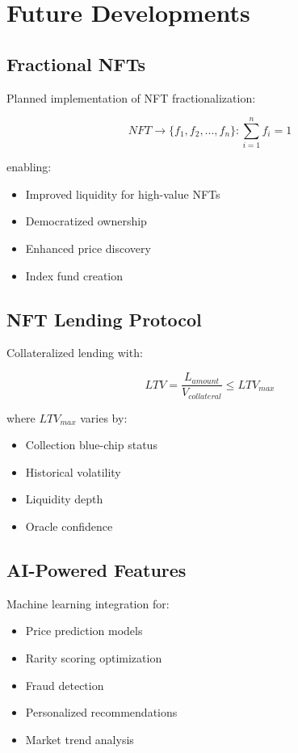 \documentclass[11pt,a4paper]{article}
\begin{document}
\section{Future Developments}

\subsection{Fractional NFTs}

Planned implementation of NFT fractionalization:

\begin{equation}
NFT \rightarrow \{f_1, f_2, ..., f_n\} : \sum_{i=1}^{n} f_i = 1
\end{equation}

enabling:
\begin{itemize}
\item Improved liquidity for high-value NFTs
\item Democratized ownership
\item Enhanced price discovery
\item Index fund creation
\end{itemize}

\subsection{NFT Lending Protocol}

Collateralized lending with:

\begin{equation}
LTV = \frac{L_{amount}}{V_{collateral}} \leq LTV_{max}
\end{equation}

where $LTV_{max}$ varies by:
\begin{itemize}
\item Collection blue-chip status
\item Historical volatility
\item Liquidity depth
\item Oracle confidence
\end{itemize}

\subsection{AI-Powered Features}

Machine learning integration for:

\begin{itemize}
\item Price prediction models
\item Rarity scoring optimization
\item Fraud detection
\item Personalized recommendations
\item Market trend analysis
\end{itemize}
\end{document}
